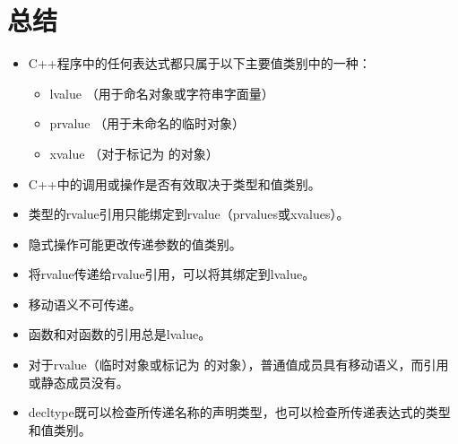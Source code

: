 \section{总结}
\begin{itemize}
	\item C++程序中的任何表达式都只属于以下主要值类别中的一种：
	\begin{itemize}
		\item lvalue （用于命名对象或字符串字面量）
		\item prvalue （用于未命名的临时对象）
		\item xvalue （对于标记为  的对象）
	\end{itemize}
	\item C++中的调用或操作是否有效取决于类型和值类别。
	\item 类型的rvalue引用只能绑定到rvalue（prvalues或xvalues）。
	\item 隐式操作可能更改传递参数的值类别。
	\item 将rvalue传递给rvalue引用，可以将其绑定到lvalue。
	\item 移动语义不可传递。
	\item 函数和对函数的引用总是lvalue。
	\item 对于rvalue（临时对象或标记为  的对象），普通值成员具有移动语义，而引用或静态成员没有。
	\item decltype既可以检查所传递名称的声明类型，也可以检查所传递表达式的类型和值类别。
\end{itemize}


